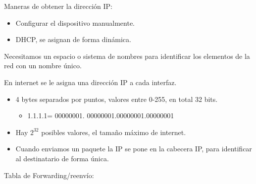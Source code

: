 \documentclass[12pt, twoside, openright]{report} %
\begin{document}
    Maneras de obtener la dirección IP:

    \begin{itemize}
    \item
      Configurar el dispositivo manualmente.
    \item
      DHCP, se asignan de forma dinámica.
    \end{itemize}

	Necesitamos un espacio o sistema de nombres para identificar los
    elementos de la red con un nombre único.
  
    En internet se le asigna una dirección IP a cada interfaz.

    \begin{itemize}
    \item
      4 bytes separados por puntos, valores entre 0-255, en total 32
      bits.

      \begin{itemize}
      \item
        1.1.1.1= 00000001. 00000001.00000001.00000001
      \end{itemize}
    \item
      Hay \(2^{32}\) posibles valores, el tamaño máximo de internet.
    \item
      Cuando enviamos un paquete la IP se pone en la cabecera IP, para
      identificar al destinatario de forma única.
    \end{itemize}

	Tabla de Forwarding/reenvío:
\end{document}

